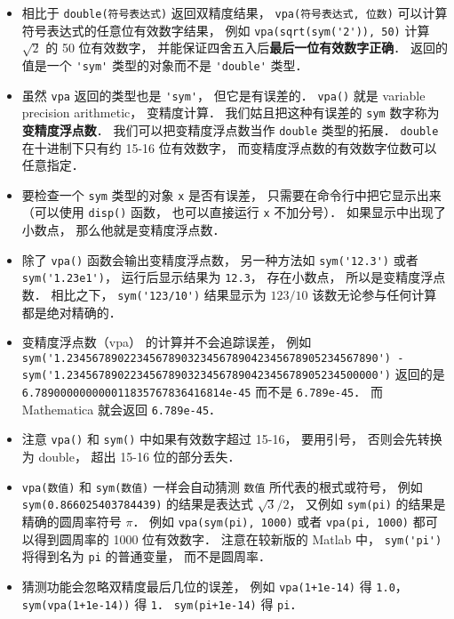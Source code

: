 \begin{itemize}
\item 相比于 \verb|double(符号表达式)| 返回双精度结果， \verb|vpa(符号表达式, 位数)| 可以计算符号表达式的任意位有效数字结果， 例如 \verb|vpa(sqrt(sym('2')), 50)| 计算 $\sqrt{2}$ 的 50 位有效数字， 并能保证四舍五入后\textbf{最后一位有效数字正确}． 返回的值是一个 \verb|'sym'| 类型的对象而不是 \verb|'double'| 类型．

\item 虽然 \verb|vpa| 返回的类型也是 \verb|'sym'|， 但它是有误差的． \verb|vpa()| 就是 variable precision arithmetic， 变精度计算． 我们姑且把这种有误差的 \verb|sym| 数字称为\textbf{变精度浮点数}． 我们可以把变精度浮点数当作 \verb|double| 类型的拓展． \verb|double| 在十进制下只有约 15-16 位有效数字， 而变精度浮点数的有效数字位数可以任意指定．

\item 要检查一个 \verb|sym| 类型的对象 \verb|x| 是否有误差， 只需要在命令行中把它显示出来（可以使用 \verb|disp()| 函数， 也可以直接运行 \verb|x| 不加分号）． 如果显示中出现了小数点， 那么他就是变精度浮点数．

\item 除了 \verb|vpa()| 函数会输出变精度浮点数， 另一种方法如 \verb|sym('12.3')| 或者 \verb|sym('1.23e1')|， 运行后显示结果为 \verb|12.3|， 存在小数点， 所以是变精度浮点数． 相比之下， \verb|sym('123/10')| 结果显示为 $123/10$ 该数无论参与任何计算都是绝对精确的．

\item 变精度浮点数（vpa） 的计算并不会追踪误差， 例如 \verb|sym('1.2345678902234567890323456789042345678905234567890') - sym('1.2345678902234567890323456789042345678905234500000')| 返回的是 \verb|6.789000000000011835767836416814e-45| 而不是 \verb|6.789e-45|． 而 Mathematica 就会返回 \verb|6.789e-45|．

\item 注意 \verb|vpa()| 和 \verb|sym()| 中如果有效数字超过 15-16， 要用引号， 否则会先转换为 double， 超出 15-16 位的部分丢失．

\item \verb|vpa(数值)| 和 \verb|sym(数值)| 一样会自动猜测 \verb|数值| 所代表的根式或符号， 例如 \verb|sym(0.866025403784439)| 的结果是表达式 $\sqrt{3}/2$， 又例如 \verb|sym(pi)| 的结果是精确的圆周率符号 $\pi$． 例如 \verb|vpa(sym(pi), 1000)| 或者 \verb|vpa(pi, 1000)| 都可以得到圆周率的 1000 位有效数字． 注意在较新版的 Matlab 中， \verb|sym('pi')| 将得到名为 \verb|pi| 的普通变量， 而不是圆周率．

\item 猜测功能会忽略双精度最后几位的误差， 例如 \verb|vpa(1+1e-14)| 得 \verb|1.0|， \verb|sym(vpa(1+1e-14))| 得 \verb|1|． \verb|sym(pi+1e-14)| 得 \verb|pi|．


\end{itemize}
